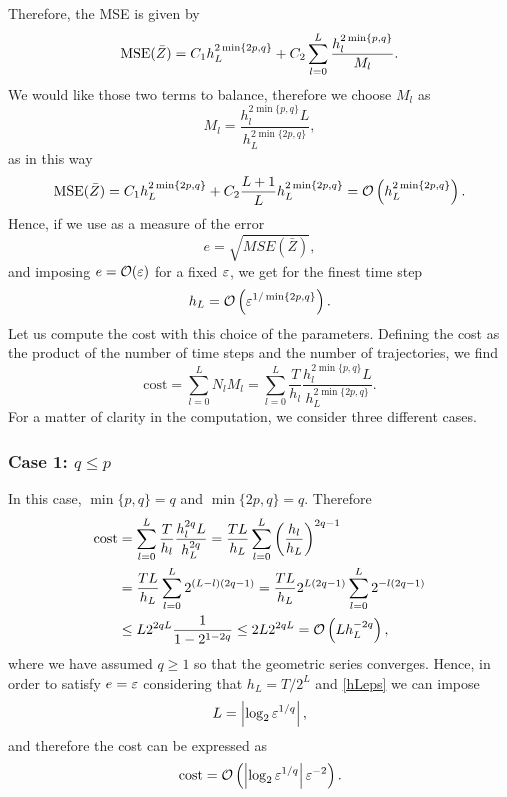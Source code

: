 \noindent Therefore, the MSE is given by
\begin{equation}
	\operatorname{MSE}(\bar Z) = C_1 h^{2\min\{2p, q\}}_L + C_2 \sum_{l=0}^L \frac{h_l^{2\min\{p, q\}}}{M_l}.
\end{equation}
We would like those two terms to balance, therefore we choose $M_l$ as
\begin{equation}
	M_l = \frac{h_l^{2\min\{p, q\}}L}{h_L^{2\min\{2p, q\}}},
\end{equation}
as in this way 
\begin{equation}
	\operatorname{MSE}(\bar Z) = C_1 h^{2\min\{2p, q\}}_L + C_2 \frac{L+1}{L} h_L^{2\min\{2p, q\}} = \mathcal{O}\left(h^{2\min\{2p, q\}}_L\right).
\end{equation}
Hence, if we use as a measure of the error
\begin{equation}
	e = \sqrt{MSE\left(\bar Z \right)},
\end{equation}
and imposing $e = \mathcal{O}(\varepsilon)$ for a fixed $\varepsilon$, we get for the finest time step
\begin{equation} \label{hLeps}
	h_L = \mathcal{O}\left(\varepsilon^{1/\min\{2p, q\}}\right).
\end{equation}
Let us compute the cost with this choice of the parameters. Defining the cost as the product of the number of time steps and the number of trajectories, we find
\begin{equation}
	\mathrm{cost} = \sum_{l=0}^L N_l M_l = \sum_{l=0}^L \frac{T}{h_l} \frac{h_l^{2\min\{p,q\}}L}{h_L^{2\min\{2p, q\}}}.
\end{equation}
For a matter of clarity in the computation, we consider three different cases. 

\subsubsection*{Case 1: $q \leq p$}
In this case, $\min\{p, q\} = q$ and $\min\{2p, q\} = q$. Therefore
\begin{equation}
\begin{aligned}
	\mathrm{cost} &=  \sum_{l=0}^L \frac{T}{h_l} \frac{h_l^{2q}L}{h_L^{2q}} = \frac{TL}{h_L} \sum_{l=0}^L \left(\frac{h_l}{h_L}\right)^{2q-1} \\
	&= \frac{TL}{h_L} \sum_{l=0}^L 2^{(L-l)(2q-1)} = \frac{TL}{h_L} 2^{L(2q-1)} \sum_{l=0}^L 2^{-l(2q-1)} \\
	&\leq L2^{2qL}\frac{1}{1 - 2^{1-2q}} \leq 2 L 2^{2qL} = \mathcal{O}\left(L h_L^{-2q}\right),
\end{aligned}
\end{equation}
where we have assumed $q \geq 1$ so that the geometric series converges. Hence, in order to satisfy $e = \varepsilon$ considering that $h_L = T / 2^L$ and \eqref{hLeps} we can impose
\begin{equation}\label{LCaseOne}
	L = \left|\log_2\varepsilon^{1/q}\right|,
\end{equation} 
and therefore the cost can be expressed as 
\begin{equation}
	\mathrm{cost} = \mathcal{O}\left(\left|\log_2 \varepsilon^{1/q}\right| \varepsilon^{-2}\right).
\end{equation}

